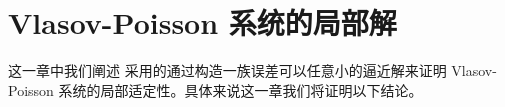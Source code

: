 
\newcommand{\supremumf}{\hyperref[eq:supremum-f0-control]{$\sup f_{0}$ 控制条件}}
\newcommand{\lipOffVsphere}{\hyperref[eq:lip_Of_f0_in_vsphere_control]{$v$ 球内 $\operatorname{lip}(f_0)$ 控制条件}}



\chapter{Vlasov-Poisson 系统的局部解}

这一章中我们阐述 \cite*{HorstClasssicalI} 采用的通过构造一族误差可以任意小的逼近解来证明 Vlasov-Poisson 系统的局部适定性。具体来说这一章我们将证明以下结论。



